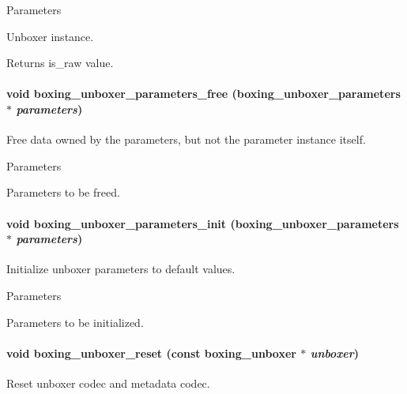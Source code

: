 \begin{DoxyParams}{Parameters}
\item[\mbox{$\leftarrow$} {\em unboxer}]Unboxer instance. \end{DoxyParams}
\begin{DoxyReturn}{Returns}
is\_\-raw value. 
\end{DoxyReturn}
\hypertarget{group__unboxer_gaa4015256c5bc7f8e1f359a583117c792}{
\paragraph[{boxing\_\-unboxer\_\-parameters\_\-free}]{\setlength{\rightskip}{0pt plus 5cm}void boxing\_\-unboxer\_\-parameters\_\-free ({\bf boxing\_\-unboxer\_\-parameters} $\ast$ {\em parameters})}\hfill}
\label{group__unboxer_gaa4015256c5bc7f8e1f359a583117c792}
Free data owned by the parameters, but not the parameter instance itself.


\begin{DoxyParams}{Parameters}
\item[\mbox{$\leftarrow$} {\em parameters}]Parameters to be freed. \end{DoxyParams}
\hypertarget{group__unboxer_ga98551069c5b6d815ea59fab7a4ac4040}{
\paragraph[{boxing\_\-unboxer\_\-parameters\_\-init}]{\setlength{\rightskip}{0pt plus 5cm}void boxing\_\-unboxer\_\-parameters\_\-init ({\bf boxing\_\-unboxer\_\-parameters} $\ast$ {\em parameters})}\hfill}
\label{group__unboxer_ga98551069c5b6d815ea59fab7a4ac4040}
Initialize unboxer parameters to default values.


\begin{DoxyParams}{Parameters}
\item[\mbox{$\leftarrow$} {\em parameters}]Parameters to be initialized. \end{DoxyParams}
\hypertarget{group__unboxer_ga16c59852a340d2d593efb5beec2ac5b2}{
\paragraph[{boxing\_\-unboxer\_\-reset}]{\setlength{\rightskip}{0pt plus 5cm}void boxing\_\-unboxer\_\-reset (const boxing\_\-unboxer $\ast$ {\em unboxer})}\hfill}
\label{group__unboxer_ga16c59852a340d2d593efb5beec2ac5b2}
Reset unboxer codec and metadata codec.



